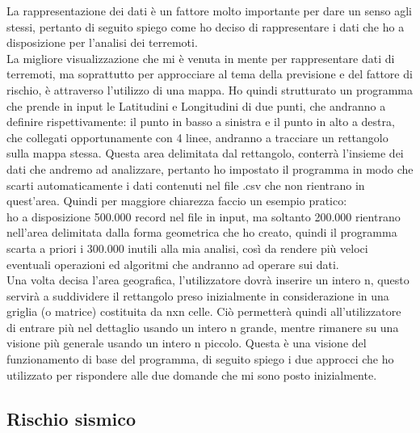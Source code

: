 La rappresentazione dei dati \`e un fattore molto importante per dare un senso agli stessi, pertanto di seguito spiego come ho deciso di rappresentare i dati che ho a disposizione per l'analisi dei terremoti.\\
La migliore visualizzazione che mi \`e venuta in mente per rappresentare dati di terremoti, ma soprattutto per approcciare al tema della previsione e del fattore di rischio, \`e attraverso l'utilizzo di una mappa. Ho quindi strutturato un programma che prende in input le Latitudini e Longitudini di due punti, che andranno a definire rispettivamente: il punto in basso a sinistra e il punto in alto a destra, che collegati opportunamente con 4 linee, andranno a tracciare un rettangolo sulla mappa stessa. Questa area delimitata dal rettangolo, conterr\`a l'insieme dei dati che andremo ad analizzare, pertanto ho impostato il programma in modo che scarti automaticamente i dati contenuti nel file .csv che non rientrano in quest'area. Quindi per maggiore chiarezza faccio un esempio pratico:\\ ho a disposizione 500.000 record nel file in input, ma soltanto 200.000 rientrano nell'area delimitata dalla forma geometrica che ho creato, quindi il programma scarta a priori i 300.000 inutili alla mia analisi, cos\`i da rendere pi\`u veloci eventuali operazioni ed algoritmi che andranno ad operare sui dati.\\
Una volta decisa l'area geografica, l'utilizzatore dovr\`a inserire un intero n, questo servir\`a a suddividere il rettangolo preso inizialmente in considerazione in una griglia (o matrice) costituita da nxn celle. Ci\`o permetter\`a quindi all'utilizzatore di entrare pi\`u nel dettaglio usando un intero n grande, mentre rimanere su una visione pi\`u generale usando un intero n piccolo. Questa \`e una visione del funzionamento di base del programma, di seguito spiego i due approcci che ho utilizzato per rispondere alle due domande che mi sono posto inizialmente.

\subsection{Rischio sismico}\label{rischioSismico}

